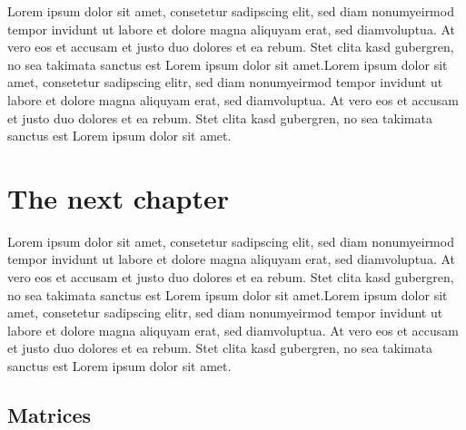 \documentclass[a4paper,11pt,twoside]{report}
\theoremstyle{definition}
\begin{document}
Lorem ipsum dolor sit amet, consetetur sadipscing elit, sed diam nonumyeirmod tempor invidunt ut labore et dolore magna aliquyam erat, sed diamvoluptua. At vero eos et accusam et justo duo dolores et ea rebum. Stet clita kasd gubergren, no sea takimata sanctus est Lorem ipsum dolor sit amet.Lorem ipsum dolor sit amet, consetetur sadipscing elitr, sed diam nonumyeirmod tempor invidunt ut labore et dolore magna aliquyam erat, sed diamvoluptua. At vero eos et accusam et justo duo dolores et ea rebum. Stet clita kasd gubergren, no sea takimata sanctus est Lorem ipsum dolor sit amet.




\chapter{The next chapter}

Lorem ipsum dolor sit amet, consetetur sadipscing elit, sed diam nonumyeirmod tempor invidunt ut labore et dolore magna aliquyam erat, sed diamvoluptua. At vero eos et accusam et justo duo dolores et ea rebum. Stet clita kasd gubergren, no sea takimata sanctus est Lorem ipsum dolor sit amet.Lorem ipsum dolor sit amet, consetetur sadipscing elitr, sed diam nonumyeirmod tempor invidunt ut labore et dolore magna aliquyam erat, sed diamvoluptua. At vero eos et accusam et justo duo dolores et ea rebum. Stet clita kasd gubergren, no sea takimata sanctus est Lorem ipsum dolor sit amet.


\section{Matrices}
\end{document}
